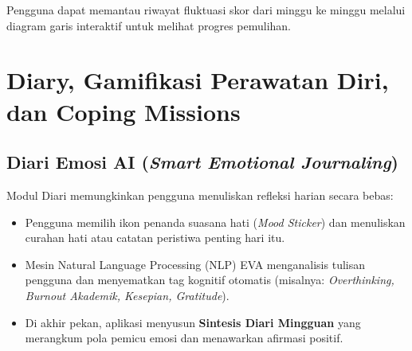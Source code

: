 Pengguna dapat memantau riwayat fluktuasi skor dari minggu ke minggu melalui diagram garis interaktif untuk melihat progres pemulihan.


\section{Diary, Gamifikasi Perawatan Diri, dan Coping Missions}

\subsection{Diari Emosi AI (\textit{Smart Emotional Journaling})}
Modul Diari memungkinkan pengguna menuliskan refleksi harian secara bebas:
\begin{itemize}[leftmargin=1.4em]
  \item Pengguna memilih ikon penanda suasana hati (\textit{Mood Sticker}) dan menuliskan curahan hati atau catatan peristiwa penting hari itu.
  \item Mesin Natural Language Processing (NLP) EVA menganalisis tulisan pengguna dan menyematkan tag kognitif otomatis (misalnya: \textit{Overthinking, Burnout Akademik, Kesepian, Gratitude}).
  \item Di akhir pekan, aplikasi menyusun \textbf{Sintesis Diari Mingguan} yang merangkum pola pemicu emosi dan menawarkan afirmasi positif.
\end{itemize}


